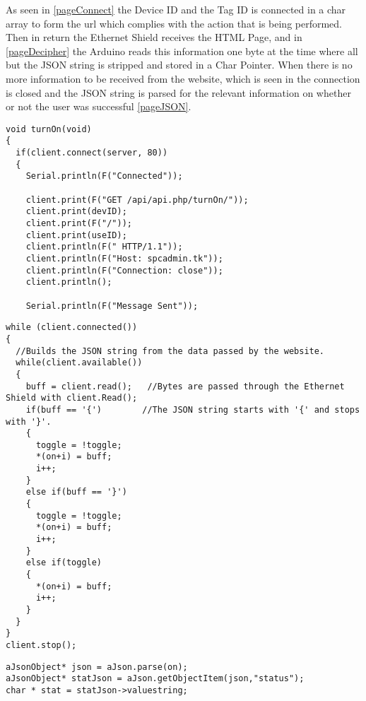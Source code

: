 As seen in \autoref{pageConnect} the Device ID and the Tag ID is connected in a char array to form the url which complies with the action that is being performed. 
Then in return the Ethernet Shield receives the HTML Page, and in \autoref{pageDecipher} the Arduino reads this information one byte at the time where all but the JSON string is stripped and stored in a Char Pointer.
When there is no more information to be received from the website, which is seen in  the connection is closed and the JSON string is parsed for the relevant information on whether or not the user was successful \autoref{pageJSON}.
\begin{lstlisting}[frame=single, label=pageConnect, caption=Connecting to the Server and creating an HTML request.]
void turnOn(void)
{
  if(client.connect(server, 80))
  {
    Serial.println(F("Connected")); 

    client.print(F("GET /api/api.php/turnOn/"));
    client.print(devID);
    client.print(F("/"));
    client.print(useID);
    client.println(F(" HTTP/1.1"));
    client.println(F("Host: spcadmin.tk"));
    client.println(F("Connection: close"));
    client.println();
    
    Serial.println(F("Message Sent"));
\end{lstlisting}

\begin{lstlisting}[frame=single, label=pageDecipher, caption=Removing all but the important information from the website.]
while (client.connected())
{
  //Builds the JSON string from the data passed by the website.
  while(client.available()) 
  { 
    buff = client.read();   //Bytes are passed through the Ethernet Shield with client.Read();
    if(buff == '{')        //The JSON string starts with '{' and stops with '}'.
    {
      toggle = !toggle;
      *(on+i) = buff;
      i++;
    }
    else if(buff == '}')
    {
      toggle = !toggle;
      *(on+i) = buff;
      i++;
    }
    else if(toggle)
    {
      *(on+i) = buff;
      i++;
    }
  }
}
client.stop();
\end{lstlisting}

\begin{lstlisting}[frame=single, label=pageJSON, caption=The JSON Code Getting a value with a Token.]
aJsonObject* json = aJson.parse(on);
aJsonObject* statJson = aJson.getObjectItem(json,"status");
char * stat = statJson->valuestring;
\end{lstlisting}
